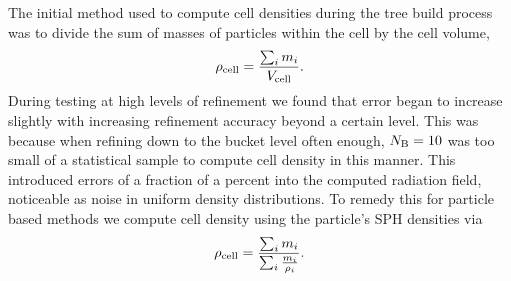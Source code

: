\documentclass[fleq,usenatbib]{mnras}
\begin{document}
The initial method used to compute cell densities during the tree build 
process was to divide the sum of masses of particles within the cell by the 
cell volume, 
\begin{equation}
\rho_{\rm cell} = \frac{\sum_i m_i}{V_{\rm cell}}.
\end{equation}
During testing at high levels of refinement we found that error began to 
increase slightly with increasing refinement accuracy beyond a certain level. 
This was because when refining down to the bucket level often enough, 
$N_{\rm B}=10$ was too small of a statistical sample to compute cell density in
this manner. This introduced errors of a fraction of a percent into the 
computed radiation field, noticeable as noise in uniform density 
distributions. To remedy this for particle based methods we compute cell 
density using the particle's SPH densities via 
\begin{equation}
\rho_{\rm cell} = \frac{\sum_i m_i}{\sum_i{\frac{m_i}{\rho_i}}}.
\end{equation}
\end{document}
